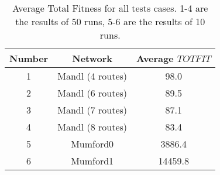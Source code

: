 \begin{table}[H]
    \centering
    \hspace*{-1.0cm}
    \begin{tabular}{|c|c|c|}
        \hline
        \textbf{Number} & \textbf{Network} & \textbf{Average $TOTFIT$}\\
        \hline
        1 & Mandl (4 routes) & 98.0\\
        
        2 & Mandl (6 routes) & 89.5\\
        
        3 & Mandl (7 routes) & 87.1\\
        
        4 & Mandl (8 routes) & 83.4\\
        
        5 & Mumford0 & 3886.4\\
        
        6 & Mumford1 & 14459.8\\
        \hline
    \end{tabular}
    \caption{Average Total Fitness for all tests cases. 1-4 are the results of 50 runs, 5-6 are the results of 10 runs.}
    \label{tabel:averageTotfitAllTestCases}
\end{table}
 












